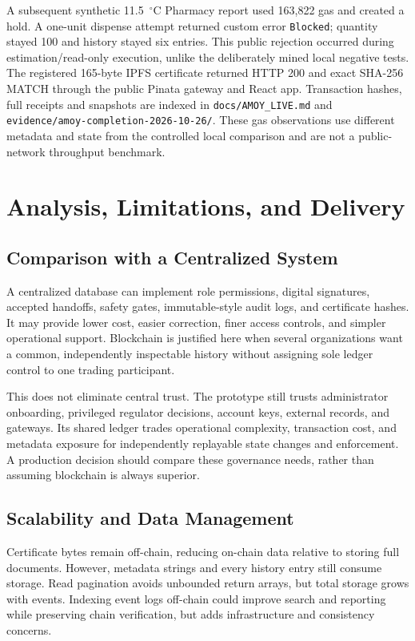 A subsequent synthetic 11.5~$^\circ$C Pharmacy report used 163,822 gas and created a hold. A one-unit dispense attempt returned custom error \texttt{Blocked}; quantity stayed 100 and history stayed six entries. This public rejection occurred during estimation/read-only execution, unlike the deliberately mined local negative tests. The registered 165-byte IPFS certificate returned HTTP 200 and exact SHA-256 MATCH through the public Pinata gateway and React app. Transaction hashes, full receipts and snapshots are indexed in \texttt{docs/AMOY\_LIVE.md} and \texttt{evidence/amoy-completion-2026-10-26/}. These gas observations use different metadata and state from the controlled local comparison and are not a public-network throughput benchmark.

\section{Analysis, Limitations, and Delivery}
\subsection{Comparison with a Centralized System}
A centralized database can implement role permissions, digital signatures, accepted handoffs, safety gates, immutable-style audit logs, and certificate hashes. It may provide lower cost, easier correction, finer access controls, and simpler operational support. Blockchain is justified here when several organizations want a common, independently inspectable history without assigning sole ledger control to one trading participant.

This does not eliminate central trust. The prototype still trusts administrator onboarding, privileged regulator decisions, account keys, external records, and gateways. Its shared ledger trades operational complexity, transaction cost, and metadata exposure for independently replayable state changes and enforcement. A production decision should compare these governance needs, rather than assuming blockchain is always superior.

\subsection{Scalability and Data Management}
Certificate bytes remain off-chain, reducing on-chain data relative to storing full documents. However, metadata strings and every history entry still consume storage. Read pagination avoids unbounded return arrays, but total storage grows with events. Indexing event logs off-chain could improve search and reporting while preserving chain verification, but adds infrastructure and consistency concerns.

